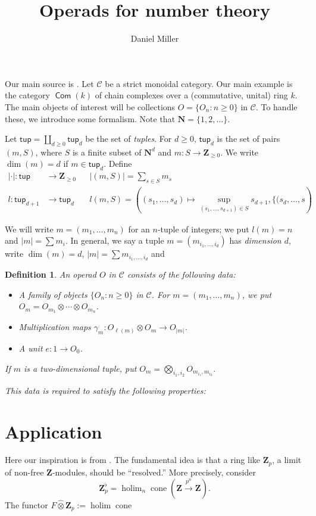\documentclass{article}
\title{Operads for number theory}
\author{Daniel Miller}
\DeclareMathOperator{\complexes}{\mathsf{Com}}
\DeclareMathOperator{\cone}{cone}
\DeclareMathOperator{\holim}{holim}
\newcommand{\cC}{\mathcal{C}}
\newcommand{\dN}{\mathbf{N}}
\newcommand{\dZ}{\mathbf{Z}}
\newcommand{\tuples}{\mathsf{tup}}
\newtheorem{definition}{Definition}
\begin{document}
\maketitle






Our main source is \cite{hinich-schechtman-1987}. 
Let $\cC$ be a strict monoidal category. Our main example is the category 
$\complexes(k)$ of chain complexes over a (commutative, unital) ring $k$. The 
main objects of interest will be collections $O=\{O_n:n\geqslant 0\}$ in $\cC$. 
To handle these, we introduce some formalism. Note that $\dN=\{1,2,\ldots\}$. 

Let $\tuples=\coprod_{d\geqslant 0} \tuples_d$ be the set of \emph{tuples}. 
For $d\geqslant 0$, $\tuples_d$ is the set of pairs $(m,S)$, where 
$S$ is a finite subset of $\dN^d$ and $m:S\to \dZ_{\geqslant 0}$. We write 
$\dim(m)=d$ if $m\in \tuples_d$. Define 
\begin{align*}
  |\cdot|:\tuples &\to \dZ_{\geqslant 0} && |(m,S)| = \sum_{s\in S} m_s \\
  l:\tuples_{d+1} &\to \tuples_d && l(m,S) = \left((s_1,\dots,s_d)\mapsto \sup_{(s_1,\dots,s_{d+1})\in S}s_{d+1}, \{(s_d,\dots,s\right)
\end{align*}

We 
will write $m = (m_1,\dots,m_n)$ for an $n$-tuple of integers; we put 
$l(m) = n$ and $|m| = \sum m_i$. 
In general, we say a tuple $m=(m_{i_1,\dots,i_d})$ has \emph{dimension $d$}, 
write $\dim(m)=d$, $|m|=\sum m_{i_1,\dots,i_d}$ and 

\begin{definition}
An \emph{operad} $O$ in $\cC$ consists of the following data: 
\begin{itemize}
  \item A family of objects $\{O_n:n\geqslant 0\}$ in $\cC$. For 
    $m = (m_1,\dots,m_n)$, we put 
    $O_m = O_{m_1}\otimes \cdots \otimes O_{m_n}$. 
  \item Multiplication maps 
    $\gamma_m:O_{\ell(m)}\otimes O_m \to O_{|m|}$. 
  \item A unit $e:1\to O_0$. 
\end{itemize}
If $m$ is a two-dimensional tuple, put 
$O_m = \bigotimes_{i_1,i_2} O_{m_{i_1},m_{i_2}}$. 

This data is required to satisfy the following properties: 
\end{definition}





\section{Application}

Here our inspiration is from \cite{beilinson-2012}. The fundamental idea is 
that a ring like $\dZ_p$, a limit of non-free $\dZ$-modules, should be 
``resolved.'' More precisely, consider 
\[
  \dZ_p^\flat = \holim_n \cone(\dZ \xrightarrow{p^n} \dZ) .
\]
The functor $F\widehat\otimes \dZ_p := \holim \cone$







\end{document}
